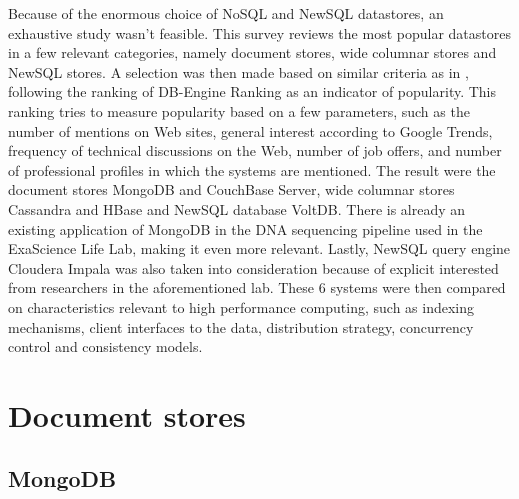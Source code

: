 \documentclass{IEEEtran}
\begin{document}
Because of the enormous choice of NoSQL and NewSQL datastores, an exhaustive study wasn't feasible. This survey reviews the most popular datastores in a few relevant categories, namely document stores, wide columnar stores and NewSQL stores. A selection was then made based on similar criteria as in \cite{grolinger2013data}, following the ranking of DB-Engine Ranking \cite{db_engine_rank} as an indicator of popularity. This ranking tries to measure popularity based on a few parameters, such as the number of mentions on Web sites, general interest according to Google Trends, frequency of technical discussions on the Web, number of job offers, and number of professional profiles in which the systems are mentioned. The result were the document stores MongoDB and CouchBase Server, wide columnar stores Cassandra and HBase and NewSQL database VoltDB. There is already an existing application of MongoDB in the DNA sequencing pipeline used in the ExaScience Life Lab, making it even more relevant\cite{elprep_mongo}. Lastly, NewSQL query engine Cloudera Impala was also taken into consideration because of explicit interested from researchers in the aforementioned lab.
These 6 systems were then compared on characteristics relevant to high performance computing, such as indexing mechanisms, client interfaces to the data, distribution strategy, concurrency control and consistency models.

%
\section{Document stores}

\subsection{MongoDB}
\end{document}
